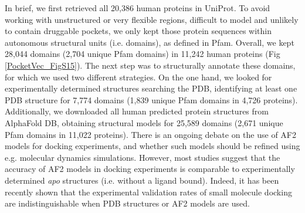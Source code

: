 In brief, we first retrieved all 20,386 human proteins in UniProt\cite{the_uniprot_consortium_uniprot_2023}. To avoid working with unstructured or very flexible regions, difficult to model and unlikely to contain druggable pockets, we only kept those protein sequences within autonomous structural units (i.e. domains), as defined in Pfam\cite{mistry_pfam_2021}. Overall, we kept 28,044 domains (2,704 unique Pfam domains) in 11,242 human proteins (Fig \ref{PocketVec_FigS15}). The next step was to structurally annotate these domains, for which we used two different strategies. On the one hand, we looked for experimentally determined structures searching the PDB\cite{goodsell_rcsb_2020}, identifying at least one PDB structure for 7,774 domains (1,839 unique Pfam domains in 4,726 proteins). Additionally, we downloaded all human predicted protein structures from AlphaFold DB, obtaining structural models for 25,589 domains (2,671 unique Pfam domains in 11,022 proteins). There is an ongoing debate on the use of AF2 models for docking experiments, and whether such models should be refined using e.g. molecular dynamics simulations. However, most studies suggest that the accuracy of AF2 models in docking experiments is comparable to experimentally determined \textit{apo} structures (i.e. without a ligand bound)\cite{zhang_benchmarking_2023, holcomb_evaluation_2023, scardino_how_2023}. Indeed, it has been recently shown that the experimental validation rates of small molecule docking are indistinguishable when PDB structures or AF2 models are used\cite{lyu_alphafold2_2023}.


